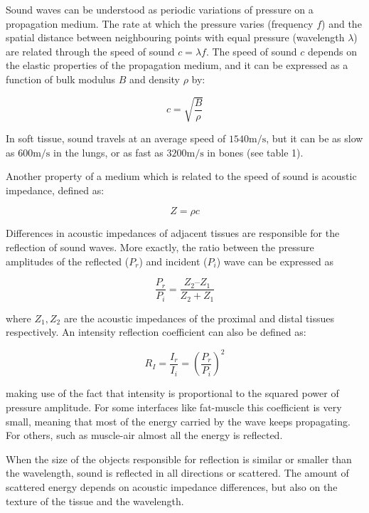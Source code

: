 \documentclass[11pt]{article} %
\begin{document}
	
	Sound waves can be understood as periodic variations of pressure on a propagation medium. The rate at which the pressure varies (frequency $f$) and the spatial distance between neighbouring points with equal pressure (wavelength $\lambda$) are related through the speed of sound $c = \lambda f$. The speed of sound $c$ depends on the elastic properties of the propagation medium, and it can be expressed as a function of bulk modulus $B$ and density $\rho$ by:
	
	\[  c = \sqrt{ \frac{B}{\rho} } \]
	
	In soft tissue, sound travels at an average speed of $ 1540 \si{\meter\per\second} $, but it can be as slow as $ 600 \si{\meter\per\second} $ in the lungs, or as fast as $ 3200 \si{\meter\per\second} $ in bones (see table 1). 
	
	
	Another property of a medium which is related to the speed of sound is acoustic impedance, defined as: 	
	
	\[ Z = \rho c \]
	 	
	Differences in acoustic impedances of adjacent tissues are responsible for the reflection of sound waves. More exactly, the ratio between the pressure amplitudes of the reflected ($P_r$) and incident ($P_i$) wave can be expressed as	
	
	\[ \frac{P_r}{P_i} = \frac{Z_2 – Z_1}{Z_2 + Z_1} \]	
	
	where $Z_1, Z_2$ are the acoustic impedances of the proximal and distal tissues respectively. An intensity reflection coefficient can also be defined as: 	
	
	\[ R_I = \frac{I_r}{I_i} = \left( \frac{P_r}{P_i} \right)^2 \]	
	
	making use of the fact that intensity is proportional to the squared power of pressure amplitude. For some interfaces like fat-muscle this coefficient is very small, meaning that most of the energy carried by the wave keeps propagating. For others, such as muscle-air almost all the energy is reflected.

	
	When the size of the objects responsible for reflection is similar or smaller than the wavelength, sound is reflected in all directions or scattered. The amount of scattered energy depends on acoustic impedance differences, but also on the texture of the tissue and the wavelength.
\end{document}
